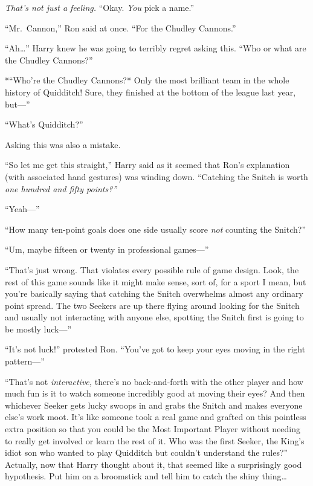 \emph{That's not just a feeling.} ``Okay. \emph{You} pick a name.''

``Mr.~Cannon,'' Ron said at once. ``For the Chudley Cannons.''

``Ah\ldots{}'' Harry knew he was going to terribly regret asking this.
``Who or what are the Chudley Cannons?''

*``Who're the Chudley Cannons?* Only the most brilliant team in the
whole history of Quidditch! Sure, they finished at the bottom of the
league last year, but---''

``What's Quidditch?''

Asking this was also a mistake.

``So let me get this straight,'' Harry said as it seemed that Ron's
explanation (with associated hand gestures) was winding down. ``Catching
the Snitch is worth \emph{one hundred and fifty points?''}

``Yeah---''

``How many ten-point goals does one side usually score \emph{not}
counting the Snitch?''

``Um, maybe fifteen or twenty in professional games---''

``That's just wrong. That violates every possible rule of game design.
Look, the rest of this game sounds like it might make sense, sort of,
for a sport I mean, but you're basically saying that catching the Snitch
overwhelms almost any ordinary point spread. The two Seekers are up
there flying around looking for the Snitch and usually not interacting
with anyone else, spotting the Snitch first is going to be mostly
luck---''

``It's not luck!'' protested Ron. ``You've got to keep your eyes moving
in the right pattern---''

``That's not \emph{interactive,} there's no back-and-forth with the
other player and how much fun is it to watch someone incredibly good at
moving their eyes? And then whichever Seeker gets lucky swoops in and
grabs the Snitch and makes everyone else's work moot. It's like someone
took a real game and grafted on this pointless extra position so that
you could be the Most Important Player without needing to really get
involved or learn the rest of it. Who was the first Seeker, the King's
idiot son who wanted to play Quidditch but couldn't understand the
rules?'' Actually, now that Harry thought about it, that seemed like a
surprisingly good hypothesis. Put him on a broomstick and tell him to
catch the shiny thing\ldots{}

